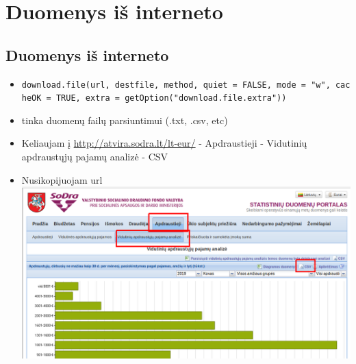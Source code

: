 \documentclass[]{article}
\newenvironment{Shaded}{\begin{snugshade}}{\end{snugshade}}
\newcommand{\KeywordTok}[1]{\textcolor[rgb]{0.13,0.29,0.53}{\textbf{#1}}}
\newcommand{\DataTypeTok}[1]{\textcolor[rgb]{0.13,0.29,0.53}{#1}}
\newcommand{\DecValTok}[1]{\textcolor[rgb]{0.00,0.00,0.81}{#1}}
\newcommand{\StringTok}[1]{\textcolor[rgb]{0.31,0.60,0.02}{#1}}
\newcommand{\NormalTok}[1]{#1}
\providecommand{\tightlist}{%
  \setlength{\itemsep}{0pt}\setlength{\parskip}{0pt}}
\begin{document}
\begin{Shaded}
\end{Shaded}

\section{Duomenys iš interneto}\label{duomenys-is-interneto}

\subsection{Duomenys iš interneto}\label{duomenys-is-interneto-1}

\begin{itemize}
\tightlist
\item
  \texttt{download.file(url,\ destfile,\ method,\ quiet\ =\ FALSE,\ mode\ =\ "w",\ cacheOK\ =\ TRUE,\ extra\ =\ getOption("download.file.extra"))}
\item
  tinka duomenų failų parsiuntimui (.txt, .csv, etc)
\item
  Keliaujam į \url{http://atvira.sodra.lt/lt-eur/} - Apdraustieji -
  Vidutinių apdraustųjų pajamų analizė - CSV
\item
  Nusikopijuojam url \includegraphics{./figures/sodra_1.png}
\end{itemize}
\end{document}
